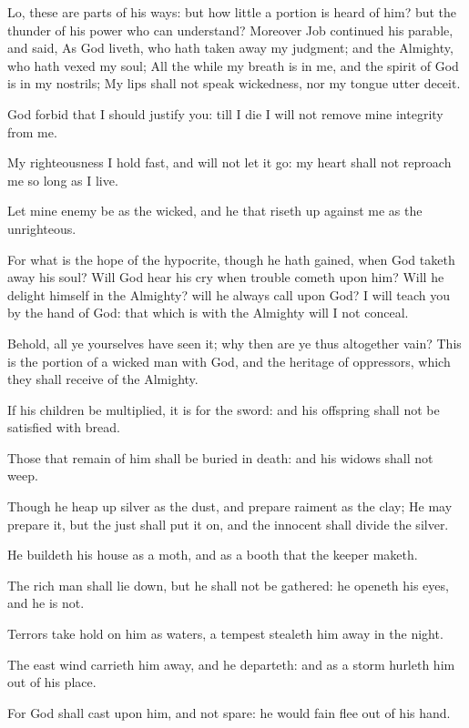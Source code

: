 \Verse Lo, these are parts of his ways: but how little a portion is heard of him? but the thunder of his power who can understand?  
\Chapter
\Verse Moreover Job continued his parable, and said, \Verse As God liveth, who hath taken away my judgment; and the Almighty, who hath vexed my soul; \Verse All the while my breath is in me, and the spirit of God is in my nostrils; \Verse My lips shall not speak wickedness, nor my tongue utter deceit.

\Verse God forbid that I should justify you: till I die I will not remove mine integrity from me.

\Verse My righteousness I hold fast, and will not let it go: my heart shall not reproach me so long as I live.

\Verse Let mine enemy be as the wicked, and he that riseth up against me as the unrighteous.

\Verse For what is the hope of the hypocrite, though he hath gained, when God taketh away his soul?  \Verse Will God hear his cry when trouble cometh upon him?  \Verse Will he delight himself in the Almighty? will he always call upon God?  \Verse I will teach you by the hand of God: that which is with the Almighty will I not conceal.

\Verse Behold, all ye yourselves have seen it; why then are ye thus altogether vain?  \Verse This is the portion of a wicked man with God, and the heritage of oppressors, which they shall receive of the Almighty.

\Verse If his children be multiplied, it is for the sword: and his offspring shall not be satisfied with bread.

\Verse Those that remain of him shall be buried in death: and his widows shall not weep.

\Verse Though he heap up silver as the dust, and prepare raiment as the clay; \Verse He may prepare it, but the just shall put it on, and the innocent shall divide the silver.

\Verse He buildeth his house as a moth, and as a booth that the keeper maketh.

\Verse The rich man shall lie down, but he shall not be gathered: he openeth his eyes, and he is not.

\Verse Terrors take hold on him as waters, a tempest stealeth him away in the night.

\Verse The east wind carrieth him away, and he departeth: and as a storm hurleth him out of his place.

\Verse For God shall cast upon him, and not spare: he would fain flee out of his hand.

